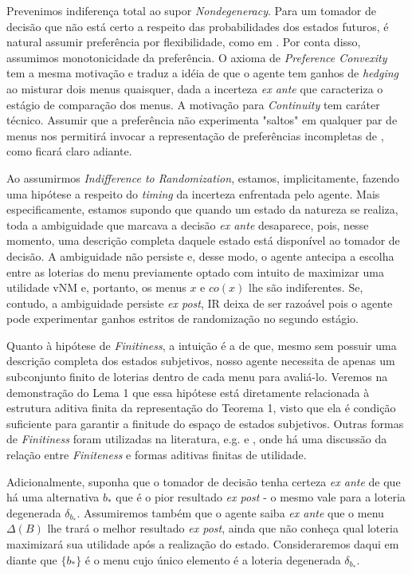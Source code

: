 \documentclass[11pt, a4paper]{article}
\theoremstyle{nonumberplain}
\theoremstyle{plain}
\theoremstyle{plain}
\theoremstyle{plain}
\begin{document}
Prevenimos indiferença total ao supor \emph{Nondegeneracy}. Para um tomador de decisão que não está certo a respeito das probabilidades dos estados futuros, é natural assumir preferência por flexibilidade, como em \cite{Kreps1979}. Por conta disso, assumimos monotonicidade da preferência. O axioma de \emph{Preference Convexity} tem a mesma motivação e traduz a idéia de que o agente tem ganhos de \emph{hedging} ao misturar dois menus quaisquer, dada a incerteza \emph{ex ante} que caracteriza o estágio de comparação dos menus. A motivação para \emph{Continuity} tem caráter técnico. Assumir que a preferência não experimenta "saltos" em qualquer par de menus nos permitirá invocar a representação de preferências incompletas de \cite{Kochov2007}, como ficará claro adiante. 

Ao assumirmos \emph{Indifference to Randomization}, estamos, implicitamente, fazendo uma hipótese a respeito do \emph{timing} da incerteza enfrentada pelo agente. Mais especificamente, estamos supondo que quando um estado da natureza se realiza, toda a ambiguidade que marcava a decisão \emph{ex ante} desaparece, pois, nesse momento, uma descrição completa daquele estado está disponível ao tomador de decisão. A ambiguidade não persiste e, desse modo, o agente antecipa a escolha entre as loterias do menu previamente optado com intuito de maximizar uma utilidade vNM e, portanto, os menus $x$ e $co(x)$ lhe são indiferentes. Se, contudo, a ambiguidade persiste \emph{ex post}, IR deixa de ser razoável pois o agente pode experimentar ganhos estritos de randomização no segundo estágio.    

Quanto à hipótese de \emph{Finitiness}, a intuição é a de que, mesmo sem possuir uma descrição completa dos estados subjetivos, nosso agente necessita de apenas um subconjunto finito de loterias dentro de cada menu para avaliá-lo. Veremos na demonstração do Lema 1 que essa hipótese está diretamente relacionada à estrutura aditiva finita da representação do Teorema 1, visto que ela é condição suficiente para garantir a finitude do espaço de estados subjetivos. Outras formas de \emph{Finitiness} foram utilizadas na literatura, e.g. \cite{Dekel2009} e \cite{Kopylov2009}, onde há uma discussão da relação entre \emph{Finiteness} e formas aditivas finitas de utilidade. 

Adicionalmente, suponha que o tomador de decisão tenha certeza \textit{ex ante} de que há uma alternativa $b_*$ que é o pior resultado \textit{ex post} - o mesmo vale para a loteria degenerada $\delta_{b_*}$. Assumiremos também que o agente saiba \textit{ex ante} que o menu $\Delta(B)$ lhe trará o melhor resultado \textit{ex post}, ainda que não conheça qual loteria maximizará sua utilidade após a realização do estado. Consideraremos daqui em diante que $\{b_*\}$ é o menu cujo único elemento é a loteria degenerada $\delta_{b_*}$.   
\end{document}
